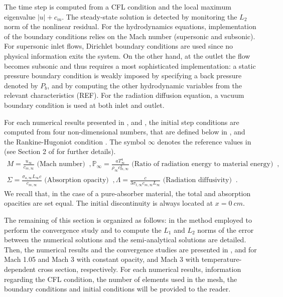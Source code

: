 \documentclass[times,doublespace]{fldauth}%
\begin{document}
The time step is computed from a CFL condition and the local maximum eigenvalue $|u|+c_m$. The steady-state solution is detected by monitoring the $L_2$ norm of the nonlinear residual. 
For the hydrodynamics equations, implementation of the boundary conditions relies on the Mach number (supersonic and subsonic). For supersonic inlet flows, Dirichlet boundary conditions are used
since no physical information exits the system. On the other hand, at the outlet the flow becomes subsonic and thus requires a most sophisticated implementation: a static 
pressure boundary condition is weakly imposed by specifying a back pressure denoted by $P_b$, and by computing the other hydrodynamic variables from the relevant characteristics (REF). 
For the radiation diffusion equation, a vacuum boundary condition is used at both inlet and outlet. 

For each numerical results presented in ,  and , the initial step conditions are computed from four non-dimensional numbers, that are defined below in , and the Rankine-Hugoniot condition \cite{toro, LowrieEdwards}. The symbol $\infty$ denotes the reference values in  (see Section 2 of \cite{LowrieEdwards} for further details).
%
\begin{eqnarray}\label{eq:scaled-nb}
M = \frac{u_\infty}{c_{m,\infty}} \text{ (Mach number) } \ , 
\mathbb{P}_\infty = \frac{a T^4_\infty}{\rho_\infty c^2_{m,\infty} } \text{ (Ratio of radiation energy to material energy) } \ , \nonumber \\
\mathbb{\Sigma} =  \frac{\sigma_{a, \infty} L_\infty c}{c_{m,\infty}} \text{ (Absorption opacity) } \ ,
\mathbb{\Lambda} = \frac{c}{3 \sigma_{t, \infty} c_{m,\infty} L_\infty} \text{ (Radiation diffusivity) } \ .
\end{eqnarray}
%
We recall that, in the case of a pure-absorber material, the total and absorption opacities are set equal. The initial discontinuity is always located at $x = 0 \ cm$. %

The remaining of this section is organized as follows: in  the method employed to perform the convergence study and to compute the $L_1$ and $L_2$ norms of the error between the numerical solutions and the semi-analytical solutions are detailed. Then, the numerical results and the convergence studies are presented in ,  and  for Mach 1.05 and Mach 3 with constant opacity, and Mach 3 with temperature-dependent cross section, respectively. For each numerical results, information regarding the CFL condition, the number of elements used in the mesh, the boundary conditions and initial conditions will be provided to the reader.
%
\end{document}
